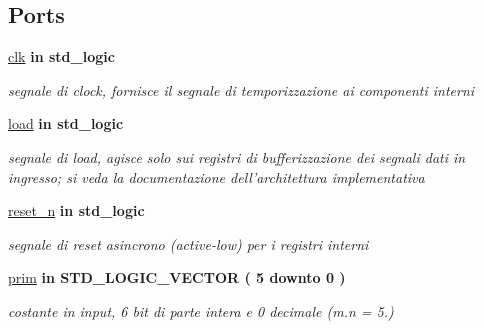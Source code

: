 \subsection*{Ports}
 \begin{DoxyCompactItemize}
\item 
\hyperlink{group___linear_regression_ga4a4609c199d30b3adebbeb3a01276ec5}{clk}  {\bfseries {\bfseries \textcolor{vhdlchar}{in}\textcolor{vhdlchar}{ }}} {\bfseries \textcolor{vhdlchar}{std\+\_\+logic}\textcolor{vhdlchar}{ }} 
\begin{DoxyCompactList}\small\item\em segnale di clock, fornisce il segnale di temporizzazione ai componenti interni \end{DoxyCompactList}\item 
\hyperlink{group___linear_regression_gaba761f7740d0b6257a0e283b3734ddbf}{load}  {\bfseries {\bfseries \textcolor{vhdlchar}{in}\textcolor{vhdlchar}{ }}} {\bfseries \textcolor{vhdlchar}{std\+\_\+logic}\textcolor{vhdlchar}{ }} 
\begin{DoxyCompactList}\small\item\em segnale di load, agisce solo sui registri di bufferizzazione dei segnali dati in ingresso; si veda la documentazione dell'architettura implementativa \end{DoxyCompactList}\item 
\hyperlink{group___linear_regression_ga446ea52ed8c4a84181a47d9165ce41a5}{reset\+\_\+n}  {\bfseries {\bfseries \textcolor{vhdlchar}{in}\textcolor{vhdlchar}{ }}} {\bfseries \textcolor{vhdlchar}{std\+\_\+logic}\textcolor{vhdlchar}{ }} 
\begin{DoxyCompactList}\small\item\em segnale di reset asincrono (active-\/low) per i registri interni \end{DoxyCompactList}\item 
\hyperlink{group___linear_regression_ga334647776cbf92a6f58a9e709678a597}{prim}  {\bfseries {\bfseries \textcolor{vhdlchar}{in}\textcolor{vhdlchar}{ }}} {\bfseries \textcolor{vhdlchar}{S\+T\+D\+\_\+\+L\+O\+G\+I\+C\+\_\+\+V\+E\+C\+T\+O\+R}\textcolor{vhdlchar}{ }\textcolor{vhdlchar}{(}\textcolor{vhdlchar}{ }\textcolor{vhdlchar}{ } \textcolor{vhdldigit}{5} \textcolor{vhdlchar}{ }\textcolor{vhdlchar}{downto}\textcolor{vhdlchar}{ }\textcolor{vhdlchar}{ } \textcolor{vhdldigit}{0} \textcolor{vhdlchar}{ }\textcolor{vhdlchar}{)}\textcolor{vhdlchar}{ }} 
\begin{DoxyCompactList}\small\item\em costante in input, 6 bit di parte intera e 0 decimale (m.\+n = 5.) \end{DoxyCompactList}\item 

\end{DoxyCompactItemize}
